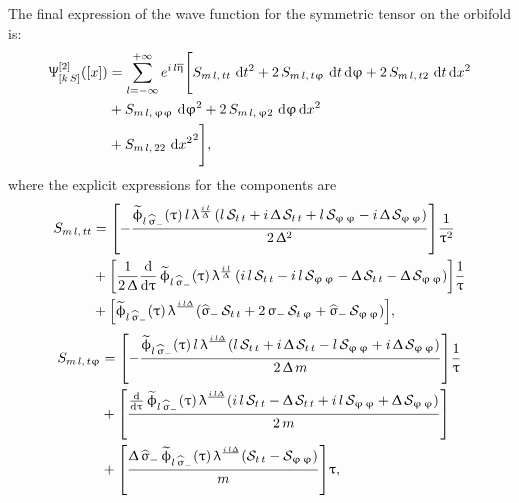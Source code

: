 The final expression of the wave function for the symmetric tensor on the orbifold is:
\begin{equation}
  \begin{split}
    \Psi^{[2]}_{\qty[k\, S]}\qty(\qty[x])
    & =
    \infinfsum{l} e^{i\, l \beta}
    \Biggl[
      S_{m\, l,\, t t}\, \dss[2]{t}  
      +
      2\, S_{m\, l,\, t \varphi}\, \dd{t} \dd{\varphi}
      +
      2\, S_{m\, l,\, t 2}\, \dd{t} \dd{x^2}
      \\
      & +
      S_{m\, l,\, \varphi \varphi}\, \dss[2]\varphi
      +
      2\, S_{m\, l,\, \varphi 2}\, \dd{\varphi} \dd{x^2}
      \\
      & +
      S_{m\, l,\, 22}\, \dd{x^2}^2
    \Biggr],
  \end{split}
\end{equation}
where the explicit expressions for the components are
\begin{equation}
  \begin{split}
    S_{m\, l,\, tt}
    & =
    \qty[%
      -
      \frac{\tphi_{\lsi}(\tau)\, l\, \lambda^{\frac{i\,l}{\Delta}}\,
      \qty(%
        l\,\cS_{t\,t}
        +
        i\,\Delta\,\cS_{t\,t}
        +
        l\,\cS_{\varphi\,\varphi}
        -
        i\,\Delta\,\cS_{\varphi\,\varphi}
      )
      }{2\,\Delta^2}
    ]
    \frac{1}{\tau^2}
    \\
    & +
    \qty[%
      \frac{1}{2\,\Delta}
      \dv{\tau}\, \tphi_{\lsi}(\tau)\,\lambda^\frac{i\,l}{\Delta}\,
      \qty(%
        i\,l\,\cS_{t\,t}
        -i\,l\,\cS_{\varphi\,\varphi}
        -\Delta\,\cS_{t\,t}
        -\Delta\,\cS_{\varphi\,\varphi}
      )
    ]
    \frac{1}{\tau}
    \\
    & +
    \qty[%
      \tphi_{\lsi}(\tau)\,\lambda^\frac{{i\,l}{\Delta}}\,
      \qty(%
        \hsigma_-\,\cS_{t\,t}
        +
        2\,\sigma_-\,\cS_{t\,\varphi}
        +
        \hsigma_-\,\cS_{\varphi\,\varphi}
      )
    ],              
  \end{split}
\end{equation}
\begin{equation}
  \begin{split}
    S_{m\, l,\, t \upvarphi}
    & =
    \qty[
      -\frac{\widetilde{\upphi}_{l\, \widehat{\upsigma}_-}(\uptau)\,l\,\uplambda^\frac{{i\,l}{\Updelta}}\,\qty(l\,\mathcal{S}_{t\,t}+i\,\Updelta\,\mathcal{S}_{t\,t}-l\,\mathcal{S}_{\upvarphi\,\upvarphi}+i\,\Updelta\,\mathcal{S}_{\upvarphi\,\upvarphi})}
      {2\,\Updelta\,{m}}
    ]
    \frac{1}{\uptau}
    \\
    & +
    \qty[
    \frac{\dv{\ensuremath{\uptau}}\,\widetilde{\upphi}_{l\, \widehat{\upsigma}_-}(\uptau)\,
      \uplambda^\frac{{i\,l}{\Updelta}}\,
      \qty(
      i\,l\,\mathcal{S}_{t\,t}
      -\Updelta\,\mathcal{S}_{t\,t}+
      i\,l\,\mathcal{S}_{\upvarphi\,\upvarphi}
      +\Updelta\,\mathcal{S}_{\upvarphi\,\upvarphi}
      )}{2\,{m}}
    ]
    \\
    & +
    \qty[
      \frac{\Updelta\, \widehat{\upsigma}_-\, \widetilde{\upphi}_{l\, \widehat{\upsigma}_-}(\uptau)\,
      \uplambda^\frac{{i\,l}{\Updelta}}\, \qty(\mathcal{S}_{t\,t}-\mathcal{S}_{\upvarphi\,\upvarphi})}{m}
    ]
    \uptau,
  \end{split}
\end{equation}
